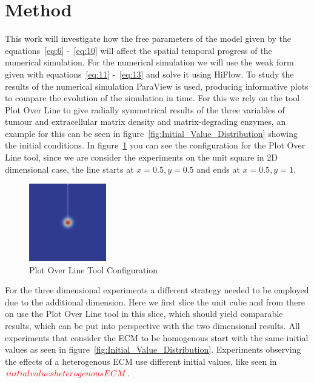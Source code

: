 

\section{Method}

This work will investigate how the free parameters of the model given by the equations~\ref{eq:6} -~\ref{eq:10} will affect the spatial temporal progress of the numerical simulation. For the numerical simulation we will use the weak form given with equations~\ref{eq:11} -~\ref{eq:13} and solve it using HiFlow. To study the results of the numerical simulation ParaView is used, producing informative plots to compare the evolution of the simulation in time. For this we rely on the tool Plot Over Line to give radially symmetrical results of the three variables of tumour and extracellular matrix density and matrix-degrading enzymes, an example for this can be seen in figure~\ref{fig:Initial_Value_Distribution} showing the initial conditions. In figure~\ref{fig:PlotOverLine} you can see the configuration for the Plot Over Line tool, since we are consider the experiments on the unit square in 2D dimensional case, the line starts at $x=0.5, y=0.5$ and ends at $x=0.5, y=1$.\newline
\begin{figure}[h]
    \centering
    \includegraphics[width=0.3\textwidth]{resources/images/plot_over_line_tool.png}
    \caption{Plot Over Line Tool Configuration}
    \label{fig:PlotOverLine}
\end{figure}
For the three dimensional experiments a different strategy needed to be employed due to the additional dimension. Here we first slice the unit cube and from there on use the Plot Over Line tool in this slice, which should yield comparable results, which can be put into perspective with the two dimensional results.\newline
All experiments that consider the ECM to be homogenous start with the same initial values as seen in figure~\ref{fig:Initial_Value_Distribution}. Experiments observing the effects of a heterogenous ECM use different initial values, like seen in $\textcolor{red}{initial values heterogenous ECM}$.\newline 
